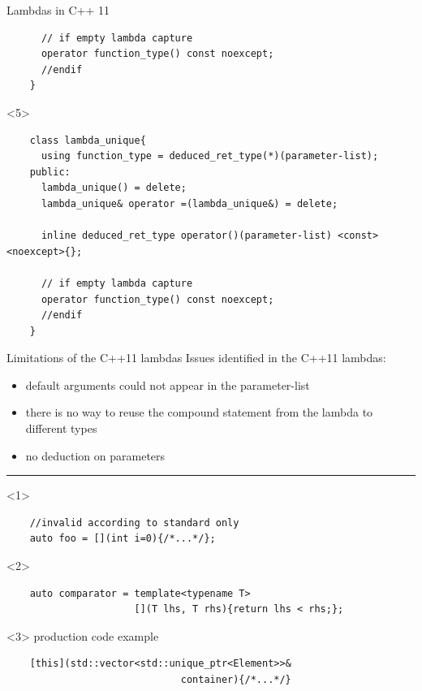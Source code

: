 \documentclass[10pt]{beamer}
\begin{document}
\begin{frame}[fragile]{Lambdas in C++ 11}
\begin{onlyenv}
\begin{verbatim}
	  // if empty lambda capture
	  operator function_type() const noexcept;
	  //endif
	}
	\end{verbatim}
	\end{onlyenv}

	\begin{onlyenv}
	\begin{verbatim}
	class lambda_unique{
	  using function_type = deduced_ret_type(*)(parameter-list); 
	public:
	  lambda_unique() = delete;
	  lambda_unique& operator =(lambda_unique&) = delete;

	  inline deduced_ret_type operator()(parameter-list) <const> <noexcept>{};
		
	  // if empty lambda capture
	  operator function_type() const noexcept;
	  //endif
	}
	\end{verbatim}
	\end{onlyenv}

\end{frame}

\begin{frame}[fragile]{Limitations of the C++11 lambdas}
	Issues identified in the C++11 lambdas:

	\begin{itemize}[<+- |alert@+>]
		\item default arguments could not appear in the parameter-list
		\item there is no way to reuse the compound statement from the lambda to different types
		\item no deduction on parameters
	\end{itemize}

	\hrule
	\vfill

	\begin{onlyenv}
	\begin{verbatim}
	//invalid according to standard only
	auto foo = [](int i=0){/*...*/};
	\end{verbatim}
	
	\end{onlyenv}

	\begin{onlyenv}
	\begin{verbatim}
	auto comparator = template<typename T>
	                  [](T lhs, T rhs){return lhs < rhs;};
	\end{verbatim}
	
	\end{onlyenv}

	\begin{onlyenv}
	\centering production code example
	\begin{verbatim}
	[this](std::vector<std::unique_ptr<Element>>&
	                          container){/*...*/}
	\end{verbatim}
	
	\end{onlyenv}

\end{frame}
\end{document}
